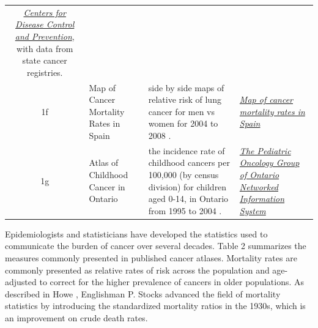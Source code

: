 \documentclass{monashthesis}
\begin{document}
\begin{longtable}[]{@{}clll@{}}
\begin{minipage}[t]{0.26\columnwidth}
\emph{\href{https://www.cdc.gov/}{Centers for Disease Control and Prevention}}, with data from state cancer registries.\strut
\end{minipage}\tabularnewline
\begin{minipage}[t]{0.08\columnwidth}\centering
1f\strut
\end{minipage} & \begin{minipage}[t]{0.20\columnwidth}\raggedright
Map of Cancer Mortality Rates in Spain\strut
\end{minipage} & \begin{minipage}[t]{0.35\columnwidth}\raggedright
side by side maps of relative risk of lung cancer for men vs women for 2004 to 2008 \autocite{cancerSpain}.\strut
\end{minipage} & \begin{minipage}[t]{0.26\columnwidth}\raggedright
\emph{\href{https://elpais.com/elpais/2014/10/06/media/1412612722_141933.html}{Map of cancer mortality rates in Spain}}\strut
\end{minipage}\tabularnewline
\begin{minipage}[t]{0.08\columnwidth}\centering
1g\strut
\end{minipage} & \begin{minipage}[t]{0.20\columnwidth}\raggedright
Atlas of Childhood Cancer in Ontario\strut
\end{minipage} & \begin{minipage}[t]{0.35\columnwidth}\raggedright
the incidence rate of childhood cancers per 100,000 (by census division) for children aged 0-14, in Ontario from 1995 to 2004 \autocite{OntarioPediatric}.\strut
\end{minipage} & \begin{minipage}[t]{0.26\columnwidth}\raggedright
\emph{\href{https://www.pogo.ca/research-data/pogonis-childhood-cancer-database/data-requests/}{The Pediatric Oncology Group of Ontario Networked Information System}}\strut
\end{minipage}\tabularnewline
\bottomrule
\end{longtable}

Epidemiologists and statisticians have developed the statistics used to communicate the burden of cancer over several decades. Table 2 summarizes the measures commonly presented in published cancer atlases. Mortality rates are commonly presented as relative rates of risk across the population and age-adjusted to correct for the higher prevalence of cancers in older populations. As described in Howe \autocite{HEDP}, Englishman P. Stocks advanced the field of mortality statistics by introducing the standardized mortality ratios in the 1930s, which is an improvement on crude death rates.
\end{document}
